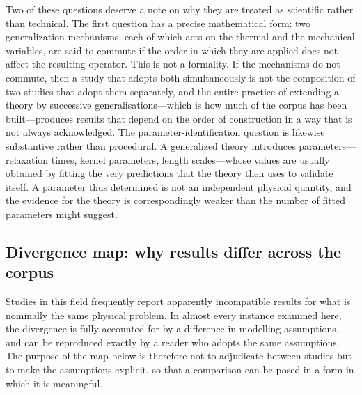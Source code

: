 Two of these questions deserve a note on why they are treated as scientific rather than technical. The first question has a precise mathematical form: two generalization mechanisms, each of which acts on the thermal and the mechanical variables, are said to commute if the order in which they are applied does not affect the resulting operator. This is not a formality. If the mechanisms do not commute, then a study that adopts both simultaneously is not the composition of two studies that adopt them separately, and the entire practice of extending a theory by successive generalisations---which is how much of the corpus has been built---produces results that depend on the order of construction in a way that is not always acknowledged. The parameter-identification question is likewise substantive rather than procedural. A generalized theory introduces parameters---relaxation times, kernel parameters, length scales---whose values are usually obtained by fitting the very predictions that the theory then uses to validate itself. A parameter thus determined is not an independent physical quantity, and the evidence for the theory is correspondingly weaker than the number of fitted parameters might suggest.

\subsection{Divergence map: why results differ across the corpus}
\label{sec:14.6}

Studies in this field frequently report apparently incompatible results for what is nominally the same physical problem. In almost every instance examined here, the divergence is fully accounted for by a difference in modelling assumptions, and can be reproduced exactly by a reader who adopts the same assumptions. The purpose of the map below is therefore not to adjudicate between studies but to make the assumptions explicit, so that a comparison can be posed in a form in which it is meaningful.

